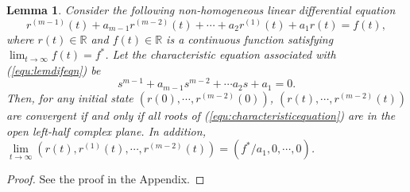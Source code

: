 \documentclass[12pt,draftcls,onecolumn]{IEEEtran}
\newtheorem{lem}{Lemma}
\begin{document}
\begin{lem}\label{lem1}
Consider the following non-homogeneous linear differential equation
\begin{equation}\label{equ:lemdifeqn}
r^{(m-1)}(t) + a_{m-1}r^{(m-2)}(t) + \cdots + a_2r^{(1)}(t) + a_1r(t) = f(t),
\end{equation}
where $r(t) \in \mathbb{R}$ and $f(t) \in \mathbb{R}$ is a continuous function satisfying $\lim_{t\to\infty}f(t) = f^*$. Let the characteristic equation associated with (\ref{equ:lemdifeqn}) be
\begin{equation}\label{equ:characteristicequation}
s^{m-1} + a_{m-1}s^{m-2} + \cdots a_2s + a_1 = 0.
\end{equation}
Then,
for any initial state $(r(0),\cdots,r^{(m-2)}(0))$, $(r(t),\cdots,r^{(m-2)}(t))$ are convergent if and only if all roots of (\ref{equ:characteristicequation}) are in the open left-half complex plane. In addition, $\lim\limits_{t\to\infty}(r(t),r^{(1)}(t),\cdots,r^{(m-2)}(t)) = (f^*/a_1,0,\cdots,0)$.
\end{lem}
\begin{proof}
See the proof in the Appendix.
\end{proof}
\end{document}
